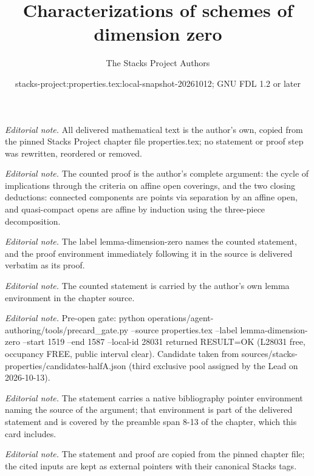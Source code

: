 \documentclass[10pt,a4paper]{amsart}
\title{Characterizations of schemes of dimension zero}
\author{The Stacks Project Authors}
\date{stacks-project:properties.tex:local-snapshot-20261012; GNU FDL 1.2 or later}
\theoremstyle{plain}
\theoremstyle{definition}
\theoremstyle{remark}
\numberwithin{equation}{subsection}
\begin{document}
\maketitle
\noindent\textit{Editorial note.} All delivered mathematical text is the author's own, copied from the pinned Stacks Project chapter file properties.tex; no statement or proof step was rewritten, reordered or removed.\par\medskip
\noindent\textit{Editorial note.} The counted proof is the author's complete argument: the cycle of implications through the criteria on affine open coverings, and the two closing deductions: connected components are points via separation by an affine open, and quasi-compact opens are affine by induction using the three-piece decomposition.\par\medskip
\noindent\textit{Editorial note.} The label lemma-dimension-zero names the counted statement, and the proof environment immediately following it in the source is delivered verbatim as its proof.\par\medskip
\noindent\textit{Editorial note.} The counted statement is carried by the author's own lemma environment in the chapter source.\par\medskip
\noindent\textit{Editorial note.} Pre-open gate: python operations/agent-authoring/tools/precard\_gate.py --source properties.tex --label lemma-dimension-zero --start 1519 --end 1587 --local-id 28031 returned RESULT=OK (L28031 free, occupancy FREE, public interval clear). Candidate taken from sources/stacks-properties/candidates-halfA.json (third exclusive pool assigned by the Lead on 2026-10-13).\par\medskip
\noindent\textit{Editorial note.} The statement carries a native bibliography pointer environment naming the source of the argument; that environment is part of the delivered statement and is covered by the preamble span 8-13 of the chapter, which this card includes.\par\medskip
\noindent\textit{Editorial note.} The statement and proof are copied from the pinned chapter file; the cited inputs are kept as external pointers with their canonical Stacks tags.\par\medskip
\end{document}
